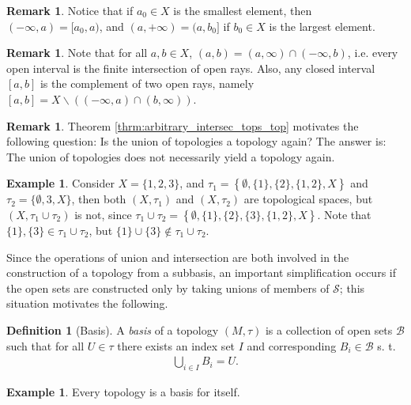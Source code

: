 \documentclass[12pt, a4paper]{article}
\numberwithin{equation}{section}
\theoremstyle{definition}
\theoremstyle{definition}
\newtheorem{defn}[thm]{Definition} %
\newtheorem{exmp}[thm]{Example} %
\newtheorem{remark}[thm]{Remark} %
\begin{document}
		\begin{remark}
			Notice that if $a_0\in X$ is the smallest element, then $(-\infty, a) = [a_0, a)$, and $ (a, +\infty) = (a, b_0]$ if $b_0\in X$ is the largest element.
		\end{remark}
	
		\begin{remark}\label{remark:open_intervals_union_open_rays}
			Note that for all $a, b\in X$, $(a, b) = (a, \infty) \cap (-\infty, b)$, i.e. every open interval is the finite intersection of open rays. Also, any closed interval $[a, b]$ is the complement of two open rays, namely $[a, b] = X \backslash \left((-\infty, a) \cap (b, \infty)\right)$.
		\end{remark}
		
		\begin{remark}
			Theorem \ref{thrm:arbitrary_intersec_tops_top} motivates the following question: Is the union of topologies a topology again? The answer is: The union of topologies does not necessarily yield a topology again.
		\end{remark}
		
		\begin{exmp}
			Consider $X = \{1, 2, 3\}$, and $\tau_1 = \left\{\emptyset, \{1\}, \{2\}, \{1, 2\}, X\right\}$ and $\tau_2=\{\emptyset, {3}, X\}$, then both $(X, \tau_1)$ and $(X, \tau_2)$ are topological spaces, but $(X, \tau_1\cup\tau_2)$ is not, since $\tau_1\cup \tau_2 = \left\{ \emptyset, \{1\}, \{2\}, \{3\}, \{1, 2\}, X \right\}$. Note that $\{1\}, \{3\}\in \tau_1\cup \tau_2$, but $\{1\}\cup \{3\}\notin \tau_1\cup\tau_2$.
		\end{exmp}
		
		Since the operations of union and intersection are both involved in the construction of a topology from a subbasis, an important simplification occurs if the open sets are constructed only by taking unions of members of $\mathscr S$; this situation motivates the following.
		
		\begin{defn}[Basis]
			A \textit{basis} of a topology $\left(M, \tau\right)$ is a collection of open sets $\mathcal B$ such that for all $U\in \tau$ there exists an index set $I$ and corresponding $B_i\in \mathcal B$ s. t. 
			\begin{align}
				\bigcup_{i\in I}B_i = U. 
			\end{align}
		\end{defn}
	
		\begin{exmp}
			Every topology is a basis for itself.
		\end{exmp}
			
\end{document}
